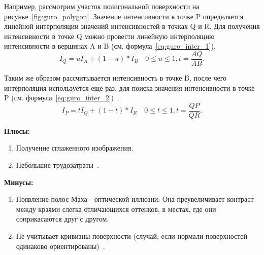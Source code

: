 Например, рассмотрим участок полигональной поверхности на рисунке~\ref{fig:guro_polygon}.
Значение интенсивности в точке P
определяется линейной интерполяции значений интенсивностей в точках Q и R.
Для получения интенсивности в точке Q можно провести линейную интерполяцию интенсивности в вершинах A и B (см. формула~\ref{eq:guro_inter_1}).
\begin{equation} 
	I_Q = uI_A+(1-u)*I_B  \quad 0 \leq u \leq 1, t = \frac{AQ}{AB}.
	\label{eq:guro_inter_1}
\end{equation}

Таким же образом рассчитывается интенсивность в точке B, после чего интерполяция используется еще раз, для поиска значения интенсивности в точке P 
(см. формула~\ref{eq:guro_inter_2})~\cite{Rodgers}.
\begin{equation} 
	I_P = tI_Q+(1-t)*I_R  \quad 0 \leq t \leq 1, t = \frac{QP}{QR}.
	\label{eq:guro_inter_2}
\end{equation}

\textbf{Плюсы:}
\begin{enumerate}
	\item Получение сглаженного изображения.
	\item Небольшие трудозатраты~\cite{Rodgers}.
\end{enumerate}

\textbf{Минусы:}
\begin{enumerate}
	\item Появление полос Маха - оптической иллюзии. 
	Она преувеличивает контраст между краями слегка отличающихся оттенков, в местах, где они соприкасаются друг с другом.
	\item Не учитывает кривизны поверхности (случай, если нормали поверхностей одинаково ориентированы)~\cite{Rodgers}.
\end{enumerate}


